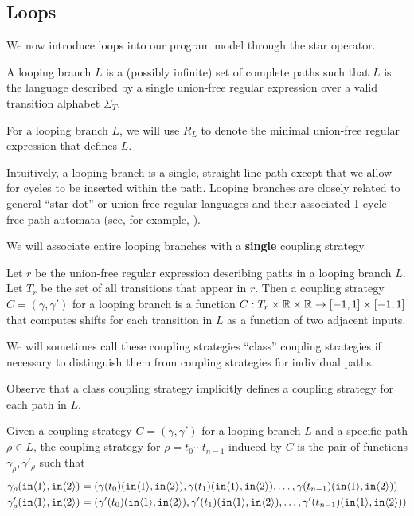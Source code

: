 
\subsection{Loops}

We now introduce loops into our program model through the star operator.

\begin{defn}
    A looping branch $L$ is a (possibly infinite) set of complete paths such that $L$ is the language described by a single union-free regular expression over a valid transition alphabet $\Sigma_T$.
\end{defn}

For a looping branch $L$, we will use $R_L$ to denote the minimal union-free regular expression that defines $L$. 

Intuitively, a looping branch is a single, straight-line path except that we allow for cycles to be inserted within the path. Looping branches are closely related to general ``star-dot'' or union-free regular languages and their associated 1-cycle-free-path-automata (see, for example, \cite{nagy2006union}).

We will associate entire looping branches with a \textbf{single} coupling strategy.

\begin{defn}
    Let $r$ be the union-free regular expression describing paths in a looping branch $L$. Let $T_r$ be the set of all transitions that appear in $r$. Then a coupling strategy $C = (\gamma, \gamma')$ for a looping branch is a function $C:T_r\times\mathbb{R} \times\mathbb{R}\to [-1, 1]\times[-1, 1]$ that computes shifts for each transition in $L$ as a function of two adjacent inputs.
\end{defn}


We will sometimes call these coupling strategies ``class'' coupling strategies if necessary to distinguish them from coupling strategies for individual paths.

Observe that a class coupling strategy implicitly defines a coupling strategy for each path in $L$.

\begin{defn}
    Given a coupling strategy $C = (\gamma, \gamma')$ for a looping branch $L$ and a specific path $\rho\in L$, the coupling strategy for $\rho=t_0\cdots t_{n-1}$ induced by $C$ is the pair of functions $\gamma_\rho, \gamma'_\rho$ such that 
    \begin{align*}
        \gamma_\rho(\texttt{in}\langle1 \rangle, \texttt{in}\langle2 \rangle) &= (\gamma(t_0)(\texttt{in}\langle1 \rangle, \texttt{in}\langle2 \rangle), \gamma(t_1)(\texttt{in}\langle1 \rangle, \texttt{in}\langle2 \rangle), \ldots,\gamma(t_{n-1})(\texttt{in}\langle1 \rangle, \texttt{in}\langle2 \rangle) )\\
        \gamma'_\rho(\texttt{in}\langle1 \rangle, \texttt{in}\langle2 \rangle) &= (\gamma'(t_0)(\texttt{in}\langle1 \rangle, \texttt{in}\langle2 \rangle), \gamma'(t_1)(\texttt{in}\langle1 \rangle, \texttt{in}\langle2 \rangle), \ldots,\gamma'(t_{n-1})(\texttt{in}\langle1 \rangle, \texttt{in}\langle2 \rangle) )
    \end{align*}
\end{defn}

